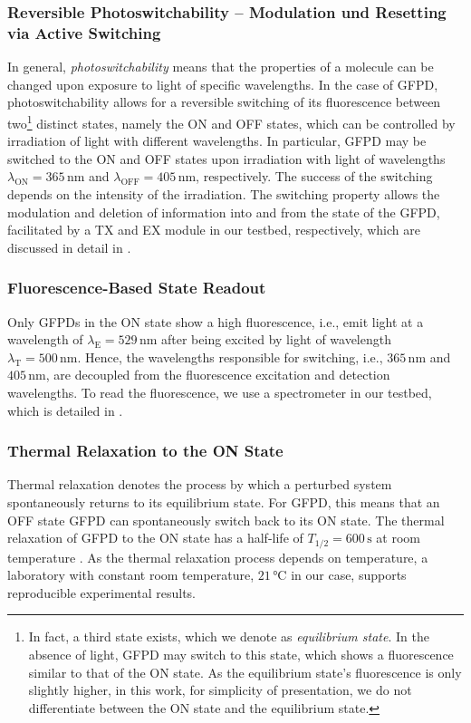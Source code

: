 \subsubsection{Reversible Photoswitchability -- Modulation und Resetting via Active Switching}\label{par:switching}
\scaleSubsubsectionBelow
In general, \textit{photoswitchability} means that the properties of a molecule can be changed upon exposure to light of specific wavelengths. In the case of \ac{GFPD}, photoswitchability allows for a reversible switching of its fluorescence between two\footnote{In fact, a third state exists, which we denote as \textit{equilibrium state}. In the absence of light, \ac{GFPD} may switch to this state, which shows a fluorescence similar to that of the ON state. As the equilibrium state's fluorescence is only slightly higher, in this work, for simplicity of presentation, we do not differentiate between the ON state and the equilibrium state.} distinct states, namely the ON and OFF states, which can be controlled by irradiation of light with different wavelengths.
In particular, \ac{GFPD} may be switched to the ON and OFF states upon irradiation with light of wavelengths $\lambda_\mathrm{ON} = 365 \, \si{\nm}$ and $\lambda_\mathrm{OFF} = 405 \, \si{\nm}$, respectively. The success of the switching depends on the intensity of the irradiation.
The switching property allows the modulation and deletion of information into and from the state of the \ac{GFPD}, facilitated by a \ac{TX} and \ac{EX} module in our testbed, respectively, which are discussed in detail in .
%
\scaleSubsubsection
\subsubsection{Fluorescence-Based State Readout}\label{par:readout}
\scaleSubsubsectionBelow
Only \acp{GFPD} in the ON state show a high fluorescence, i.e., emit light at a wavelength of $\lambda_\mathrm{E} = 529 \, \si{\nm}$ after being excited by light of wavelength $\lambda_\mathrm{T} = 500 \, \si{\nm}$. Hence, the wavelengths responsible for switching, i.e., $365 \, \si{\nm}$ and $405 \, \si{\nm}$, are decoupled from the fluorescence excitation and detection wavelengths. To read the fluorescence, we use a spectrometer in our testbed, which is detailed in .
%
\scaleSubsubsection
\subsubsection{Thermal Relaxation to the ON State}\label{par:relaxation}
\scaleSubsubsectionBelow
%
Thermal relaxation denotes the process by which a perturbed system spontaneously returns to its equilibrium state. For \ac{GFPD}, this means that an OFF state \ac{GFPD} can spontaneously switch back to its ON state. The thermal relaxation of \ac{GFPD} to the ON state has a half-life of $T_{1/2} = 600 \,\si{\second}$ at room temperature \cite{brakemann2011reversibly}. As the thermal relaxation process depends on temperature, a laboratory with constant room temperature, $21 \, \si{\celsius}$ in our case, supports reproducible experimental results.

